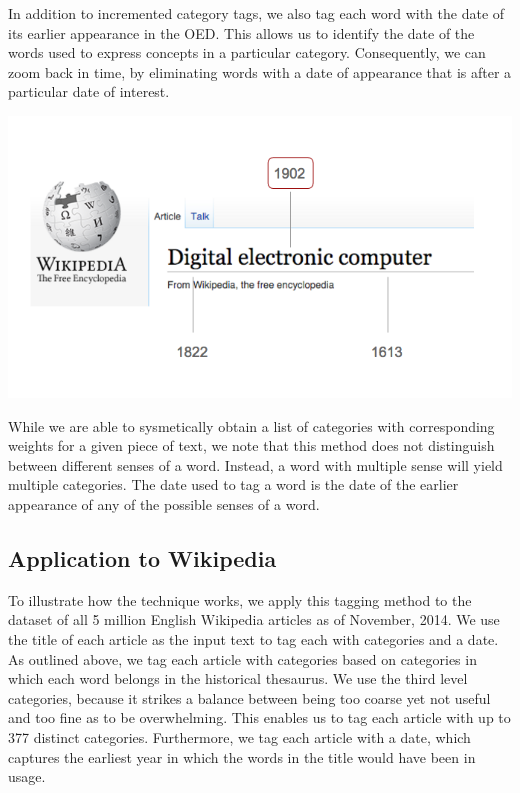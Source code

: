 \documentclass[a4paper, 12pt]{article}
\begin{document}
In addition to incremented category tags, we also tag each word with the date of its earlier appearance in 
the OED. This allows us to identify the date of the words used to express concepts in a particular category.
Consequently, we can zoom back in time, by eliminating words with a date of appearance that is after
a particular date of interest.

\includegraphics[width=\textwidth]{title_dates}  


While we are able to sysmetically obtain a list of categories with corresponding weights for a given 
piece of text, we note that this method does not distinguish between different senses of a word. 
Instead, a word with multiple sense will yield multiple categories. The date used to tag a word is the 
date of the earlier appearance of any of the possible senses of a word.


\subsection*{Application to Wikipedia}

To illustrate how the technique works, we apply this tagging method to the dataset of all 
5 million English Wikipedia articles  as of November, 2014. 
We use the title of each article as the input text to tag each with categories and a date.
As outlined above, we tag each article with categories based on categories in which each word 
belongs in the historical thesaurus. 
We use the third level categories, because it strikes a balance between being too coarse 
yet not useful and too fine as to be overwhelming. 
This enables us to tag each article with up to 377 distinct categories. Furthermore, 
we tag each article with a date, which captures the earliest year in which the words
in the title would have been in usage. 
\end{document}
